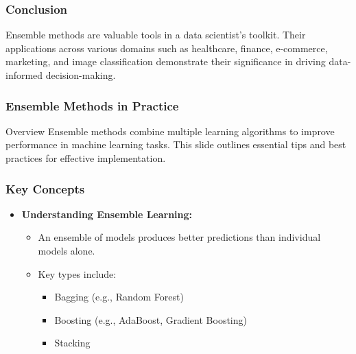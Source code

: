 \documentclass[aspectratio=169]{beamer}
\begin{document}
\begin{frame}[fragile]
    \frametitle{Conclusion}
    Ensemble methods are valuable tools in a data scientist's toolkit. Their applications across various domains such as healthcare, finance, e-commerce, marketing, and image classification demonstrate their significance in driving data-informed decision-making.
\end{frame}

\begin{frame}
    \frametitle{Ensemble Methods in Practice}
    \begin{block}{Overview}
        Ensemble methods combine multiple learning algorithms to improve performance in machine learning tasks. This slide outlines essential tips and best practices for effective implementation.
    \end{block}
\end{frame}

\begin{frame}
    \frametitle{Key Concepts}
    \begin{itemize}
        \item \textbf{Understanding Ensemble Learning:}
        \begin{itemize}
            \item An ensemble of models produces better predictions than individual models alone.
            \item Key types include:
            \begin{itemize}
                \item Bagging (e.g., Random Forest)
                \item Boosting (e.g., AdaBoost, Gradient Boosting)
                \item Stacking
            \end{itemize}
        \end{itemize}
    \end{itemize}
\end{frame}
\end{document}
